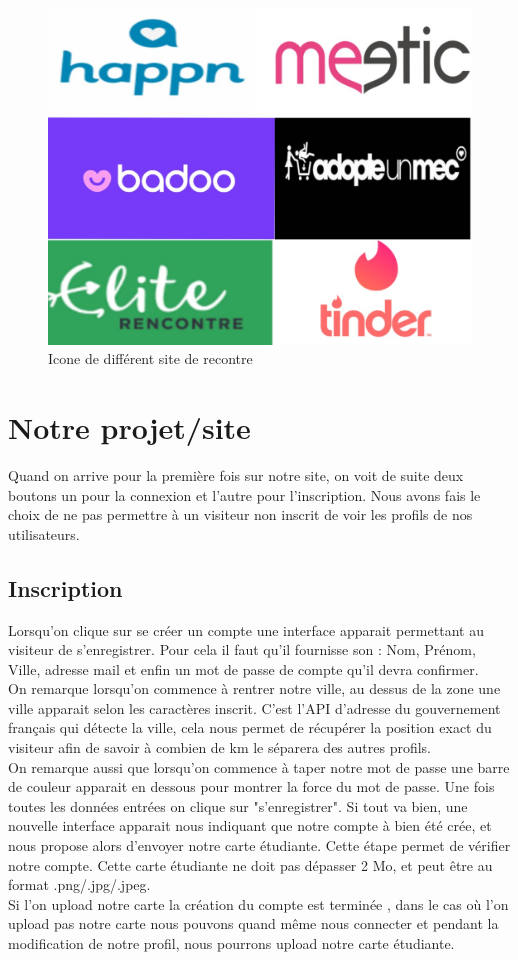 \documentclass[12pt]{report}
\begin{document}
\begin{figure}[h!]
	\begin{center}
		\includegraphics[scale=0.3]{intro.jpg}
	\end{center}
		\caption{Icone de différent site de recontre}
\end{figure}
\clearpage

\section{Notre projet/site}
	Quand on arrive pour la première fois sur notre site, on voit de suite deux boutons un pour la connexion et l'autre pour l'inscription. Nous avons fais le choix de ne pas permettre à un visiteur non inscrit de voir les profils de nos utilisateurs.
	\subsection{Inscription}
	Lorsqu'on clique sur se créer un compte une interface apparait permettant au visiteur de s'enregistrer. Pour cela il faut qu'il fournisse son : Nom, Prénom, Ville, adresse mail et enfin un mot de passe de compte qu'il devra confirmer.\\
	On remarque lorsqu'on commence à rentrer notre ville, au dessus de la zone une ville apparait selon les caractères inscrit. C'est l'API d'adresse du gouvernement français qui détecte la ville, cela nous permet de récupérer la position exact du visiteur afin de savoir à combien de km le séparera des autres profils.\\
On remarque aussi que lorsqu'on commence à taper notre mot de passe une barre de couleur apparait en dessous pour montrer la force du mot de passe. Une fois toutes les données entrées on clique sur "s'enregistrer". Si tout va bien, une nouvelle interface apparait nous indiquant que notre compte à bien été crée, et nous propose alors d'envoyer notre carte étudiante. Cette étape permet de vérifier notre compte. Cette carte étudiante ne doit pas dépasser 2 Mo, et peut être au format .png/.jpg/.jpeg.\\
Si l'on upload notre carte la création du compte est terminée , dans le cas où l'on upload pas notre carte nous pouvons quand même nous connecter et pendant la modification de notre profil, nous pourrons upload notre carte étudiante.
\end{document}
